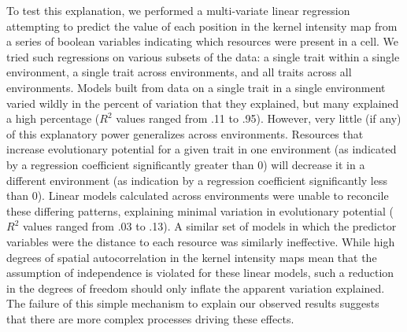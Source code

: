 To test this explanation, we performed a multi-variate linear regression attempting to predict the value of each position in the kernel intensity map from a series of boolean variables indicating which resources were present in a cell. We tried such regressions on various subsets of the data: a single trait within a single environment, a single trait across environments, and all traits across all environments. Models built from data on a single trait in a single environment varied wildly in the percent of variation that they explained, but many explained a high percentage ($R^{2}$ values ranged from .11 to .95). However, very little (if any) of this explanatory power generalizes across environments. Resources that increase evolutionary potential for a given trait in one environment (as indicated by a regression coefficient significantly greater than 0) will decrease it in a different environment (as indication by a regression coefficient significantly less than 0). Linear models calculated across environments were unable to reconcile these differing patterns, explaining minimal variation in evolutionary potential ($R^{2}$ values ranged from .03 to .13). A similar set of models in which the predictor variables were the distance to each resource was similarly ineffective. While high degrees of spatial autocorrelation in the kernel intensity maps mean that the assumption of independence is violated for these linear models, such a reduction in the degrees of freedom should only inflate the apparent variation explained. The failure of this simple mechanism to explain our observed results suggests that there are more complex processes driving these effects.

